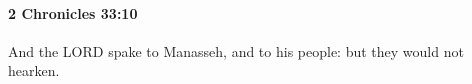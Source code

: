 
		\paragraph{2 Chronicles 33:10} %
			\label{2CHRONICLES-33-10}

			And the LORD spake to Manasseh, and to his people: but they would not hearken.


